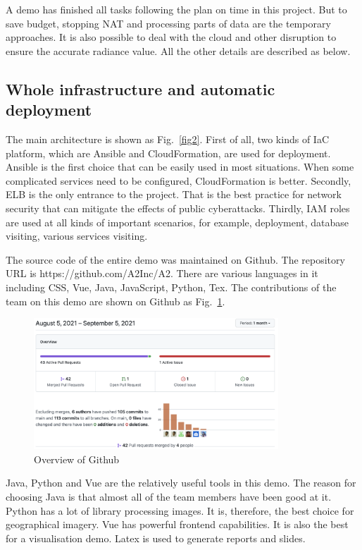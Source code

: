 \documentclass[conference]{IEEEtran}
\begin{document}
A demo has finished all tasks following the plan on time in this project. But to save budget, stopping NAT and processing parts of data are 
the temporary approaches. It is also possible to deal with the cloud and other disruption to ensure the accurate radiance value. All the 
other details are described as below.

\subsection{Whole infrastructure and automatic deployment}

The main architecture is shown as Fig.~\ref{fig2}. First of all, two kinds of IaC platform, which are Ansible and CloudFormation, are used for deployment.
Ansible is the first choice that can be easily used in most situations. When some complicated services need to be configured, CloudFormation is 
better. Secondly, ELB is the only entrance to the project. That is the best practice for network security that can mitigate the effects 
of public cyberattacks. Thirdly, IAM roles are used at all kinds of important scenarios, for example, deployment, database visiting, various services visiting.

The source code of the entire demo was maintained on Github. The repository URL is https://github.com/A2Inc/A2. There are various languages in it including 
CSS, Vue, Java, JavaScript, Python, Tex. The contributions of the team on this demo are shown on Github as Fig.~\ref{fig3}.

\begin{figure}[htbp]
    \centerline{\includegraphics[width=260pt]{images/github.png}}
    \caption{Overview of Github}
    \label{fig3}
\end{figure}

Java, Python and Vue are the relatively useful tools in this demo. The reason for choosing Java is that almost all of the team members have been good at it. Python 
has a lot of library processing images. It is, therefore, the best choice for geographical imagery. Vue has powerful frontend capabilities. It is also the best for a 
visualisation demo. Latex is used to generate reports and slides.
\end{document}

